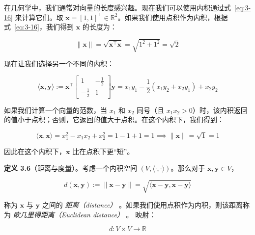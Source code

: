 \begin{notebox}
在几何学中，我们通常对向量的长度感兴趣。现在我们可以使用内积通过式~\eqref{eq:3-16} 来计算它们。取 $ \boldsymbol{x} = [1, 1]^\top \in \mathbb{R}^2 $。如果我们使用点积作为内积，根据式~\eqref{eq:3-16}，我们得到 $ \boldsymbol{x} $ 的长度为：

\begin{equation}
\|\boldsymbol{x}\| = \sqrt{\boldsymbol{x}^\top \boldsymbol{x}} = \sqrt{1^2 + 1^2} = \sqrt{2}
\tag{3.18}\label{eq:3-18}
\end{equation}

现在让我们选择另一个不同的内积：

\begin{equation}
\langle \boldsymbol{x}, \boldsymbol{y} \rangle := \boldsymbol{x}^\top \begin{bmatrix} 1 & -\frac{1}{2} \\ -\frac{1}{2} & 1 \end{bmatrix} \boldsymbol{y} = x_1 y_1 - \frac{1}{2}(x_1 y_2 + x_2 y_1) + x_2 y_2
\tag{3.19}\label{eq:3-19}
\end{equation}

如果我们计算一个向量的范数，当 $ x_1 $ 和 $ x_2 $ 同号（且 $ x_1 x_2 > 0 $）时，该内积返回的值小于点积；否则，它返回的值大于点积。在这个内积下，我们得到：

\begin{equation}
\langle \boldsymbol{x}, \boldsymbol{x} \rangle = x_1^2 - x_1 x_2 + x_2^2 = 1 - 1 + 1 = 1 \implies \|\boldsymbol{x}\| = \sqrt{1} = 1
\tag{3.20}\label{eq:3-20}
\end{equation}

因此在这个内积下，$ \boldsymbol{x} $ 比在点积下更“短”。
\end{notebox}

\textbf{定义 3.6}（距离与度量）。考虑一个内积空间 $ (V, \langle \cdot, \cdot \rangle) $。那么对于 $ \boldsymbol{x}, \boldsymbol{y} \in V $，

\begin{equation}
d(\boldsymbol{x}, \boldsymbol{y}) := \|\boldsymbol{x} - \boldsymbol{y}\| = \sqrt{\langle \boldsymbol{x} - \boldsymbol{y}, \boldsymbol{x} - \boldsymbol{y} \rangle}
\tag{3.21}\label{eq:3-21}
\end{equation}

称为 $ \boldsymbol{x} $ 与 $ \boldsymbol{y} $ 之间的 \emph{距离（distance）} 。如果我们使用点积作为内积，则该距离称为 \emph{欧几里得距离（Euclidean distance）} 。 映射：

\begin{equation}
d : V \times V \to \mathbb{R}
\tag{3.22}\label{eq:3-22}
\end{equation}

